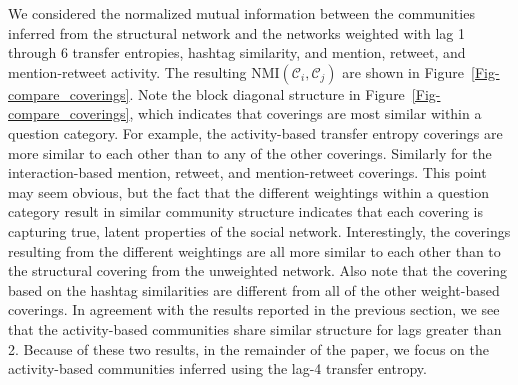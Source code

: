 We considered the normalized mutual information between the communities inferred from the structural network and the networks weighted with lag 1 through 6 transfer entropies, hashtag similarity, and mention, retweet, and mention-retweet activity. The resulting $\text{NMI}(\mathcal{C}_{i}, \mathcal{C}_{j})$ are shown in Figure~\ref{Fig-compare_coverings}. Note the block diagonal structure in Figure~\ref{Fig-compare_coverings}, which indicates that coverings are most similar within a question category. For example, the activity-based transfer entropy coverings are more similar to each other than to any of the other coverings. Similarly for the interaction-based mention, retweet, and mention-retweet coverings. This point may seem obvious, but the fact that the different weightings within a question category result in similar community structure indicates that each covering is capturing true, latent properties of the social network. Interestingly, the coverings resulting from the different weightings are all more similar to each other than to the structural covering from the unweighted network. Also note that the covering based on the hashtag similarities are different from all of the other weight-based coverings. In agreement with the results reported in the previous section, we see that the activity-based communities share similar structure for lags greater than 2. Because of these two results, in the remainder of the paper, we focus on the activity-based communities inferred using the lag-4 transfer entropy.

